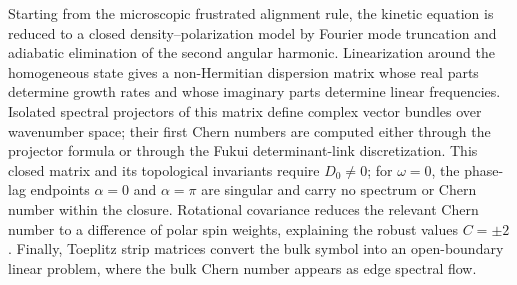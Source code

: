 \documentclass[11pt]{article}
\numberwithin{equation}{section}
\begin{document}
Starting from the microscopic frustrated alignment rule, the kinetic
equation is reduced to a closed density--polarization model by Fourier
mode truncation and adiabatic elimination of the second angular harmonic.
Linearization around the homogeneous state gives a non-Hermitian
dispersion matrix whose real parts determine growth rates and whose
imaginary parts determine linear frequencies. Isolated spectral
projectors of this matrix define complex vector bundles over wavenumber
space; their first Chern numbers are computed either through the
projector formula or through the Fukui determinant-link discretization.
This closed matrix and its topological invariants require $D_0\ne0$; for
$\omega=0$, the phase-lag endpoints $\alpha=0$ and $\alpha=\pi$ are singular and
carry no spectrum or Chern number within the closure.
Rotational covariance reduces the relevant Chern number to a difference
of polar spin weights, explaining the robust values $C=\pm2$. Finally,
Toeplitz strip matrices convert the bulk symbol into an open-boundary
linear problem, where the bulk Chern number appears as edge spectral flow.
\end{document}
